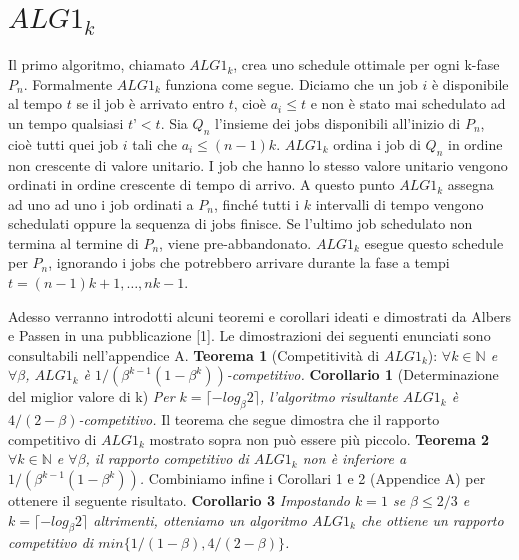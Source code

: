 \documentclass[12pt]{article}
\newcommand*{\N}{\mathbb{N}}
\begin{document}
\section{$ALG1_{k}$}
Il primo algoritmo, chiamato $ALG1_{k}$, crea uno schedule ottimale per ogni k-fase $P_{n}$. Formalmente $ALG1_{k}$ funziona come segue. Diciamo che un job $i$ è disponibile al tempo $t$ se il job è arrivato entro $t$, cioè $a_{i} \leq t$ e non è stato mai schedulato ad un tempo qualsiasi $t’ < t$. Sia $Q_{n}$ l’insieme dei jobs disponibili all’inizio di $P_{n}$, cioè tutti quei job $i$ tali che $a_{i} \leq (n-1)k$. $ALG1_{k}$ ordina i job di $Q_{n}$ in ordine non crescente di valore unitario. I job che hanno lo stesso valore unitario vengono ordinati in ordine crescente di tempo di arrivo. A questo punto $ALG1_{k}$ assegna ad uno ad uno i job ordinati a $P_{n}$, finché tutti i $k$ intervalli di tempo vengono schedulati oppure la sequenza di jobs finisce. Se l’ultimo job schedulato non termina al termine di $P_{n}$, viene pre-abbandonato. $ALG1_{k}$ esegue questo schedule per $P_{n}$, ignorando i jobs che potrebbero arrivare durante la fase a tempi $t = (n-1)k + 1,…, nk - 1$. 

Adesso verranno introdotti alcuni teoremi e corollari ideati e dimostrati da Albers e Passen in una pubblicazione [1]. Le dimostrazioni dei seguenti enunciati sono consultabili nell'appendice A.
\newline\newline
\textbf{Teorema 1} (Competitività di $ALG1_{k}$): \textit{ $\forall k \in \N$ e $\forall \beta$, $ALG1_{k}$ è $1/(\beta^{k-1}(1 - \beta^{k}))$-competitivo.}
\newline \newline
\textbf{Corollario 1} (Determinazione del miglior valore di k)
\textit{Per $k = \lceil-log_{\beta} 2\rceil$, l'algoritmo risultante $ALG1_{k}$ è $4 / (2 - \beta )$-competitivo.} \newline\newline
Il teorema che segue dimostra che il rapporto competitivo di $ALG1_{k}$ mostrato sopra non può essere più piccolo.\newline\newline
\textbf{Teorema 2}
\textit{$\forall k \in \N$ e $\forall \beta$, il rapporto competitivo di $ALG1_{k}$ non è inferiore a $1 / (\beta^{k - 1} (1 - \beta^{k}))$.}\newline\newline
Combiniamo infine i Corollari 1 e 2 (Appendice A) per ottenere il seguente risultato.\newline\newline
\textbf{Corollario 3}
\textit{Impostando $k = 1$ se $\beta  \leq 2/3$ e $k = \lceil- log_{\beta}2\rceil$ altrimenti, otteniamo un algoritmo $ALG1_{k}$ che ottiene un rapporto competitivo di $min\{1 / (1 - \beta ), 4 / (2 - \beta )\}$.}
\end{document}

